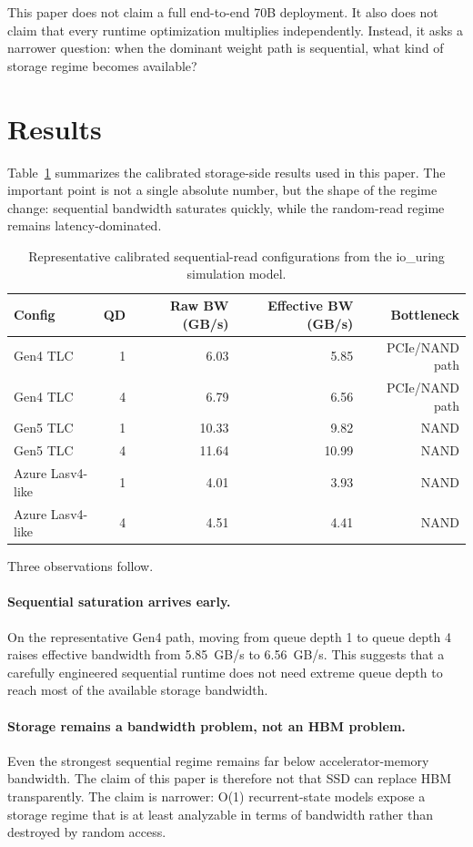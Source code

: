 \documentclass[11pt]{article}
\begin{document}
This paper does not claim a full end-to-end 70B deployment. It also does not claim that every runtime optimization multiplies independently. Instead, it asks a narrower question: when the dominant weight path is sequential, what kind of storage regime becomes available?

\section{Results}
Table~\ref{tab:storage-model} summarizes the calibrated storage-side results used in this paper. The important point is not a single absolute number, but the shape of the regime change: sequential bandwidth saturates quickly, while the random-read regime remains latency-dominated.

\begin{table}[t]
\centering
\caption{Representative calibrated sequential-read configurations from the io\_uring simulation model.}
\label{tab:storage-model}
\begin{tabular}{lrrrr}
\toprule
Config & QD & Raw BW (GB/s) & Effective BW (GB/s) & Bottleneck \\
\midrule
Gen4 TLC & 1 & 6.03 & 5.85 & PCIe/NAND path \\
Gen4 TLC & 4 & 6.79 & 6.56 & PCIe/NAND path \\
Gen5 TLC & 1 & 10.33 & 9.82 & NAND \\
Gen5 TLC & 4 & 11.64 & 10.99 & NAND \\
Azure Lasv4-like & 1 & 4.01 & 3.93 & NAND \\
Azure Lasv4-like & 4 & 4.51 & 4.41 & NAND \\
\bottomrule
\end{tabular}
\end{table}

Three observations follow.

\paragraph{Sequential saturation arrives early.}
On the representative Gen4 path, moving from queue depth 1 to queue depth 4 raises effective bandwidth from 5.85~GB/s to 6.56~GB/s. This suggests that a carefully engineered sequential runtime does not need extreme queue depth to reach most of the available storage bandwidth.

\paragraph{Storage remains a bandwidth problem, not an HBM problem.}
Even the strongest sequential regime remains far below accelerator-memory bandwidth. The claim of this paper is therefore not that SSD can replace HBM transparently. The claim is narrower: O(1) recurrent-state models expose a storage regime that is at least analyzable in terms of bandwidth rather than destroyed by random access.
\end{document}
